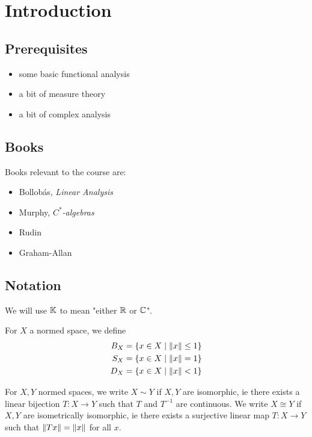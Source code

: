 \documentclass{article}
\begin{document}
\maketitle

\tableofcontents

\clearpage

\section{Introduction}

\subsection*{Prerequisites}

\begin{itemize}
  \item some basic functional analysis
  \item a bit of measure theory
  \item a bit of complex analysis
\end{itemize}

\subsection*{Books}

Books relevant to the course are:
\begin{itemize}
  \item Bollob\'as, \textit{Linear Analysis}
  \item Murphy, \textit{$C^*$-algebras}
  \item Rudin
  \item Graham-Allan
\end{itemize}

\subsection*{Notation}

We will use $\mathbb K$ to mean "either $\mathbb R$ or $\mathbb C$".

For $X$ a normed space, we define
\begin{align*}
  B_X & = \{x \in X \mid \left\lVert x\right\rVert \le 1\} \\
  S_X & = \{x \in X \mid \left\lVert x\right\rVert = 1\} \\
  D_X & = \{x \in X \mid \left\lVert x\right\rVert < 1\}
\end{align*}

For $X, Y$ normed spaces, we write $X \sim Y$ if $X, Y$ are isomorphic, ie there
exists a linear bijection $T : X \to Y$ such that $T$ and $T^{-1}$ are continuous. We write $X \cong Y$ if $X, Y$ are isometrically isomorphic, ie there exists a surjective linear map $T : X \to Y$ such that $\left\lVert T x\right\rVert = \left\lVert x\right\rVert$ for all $x$.
\end{document}
